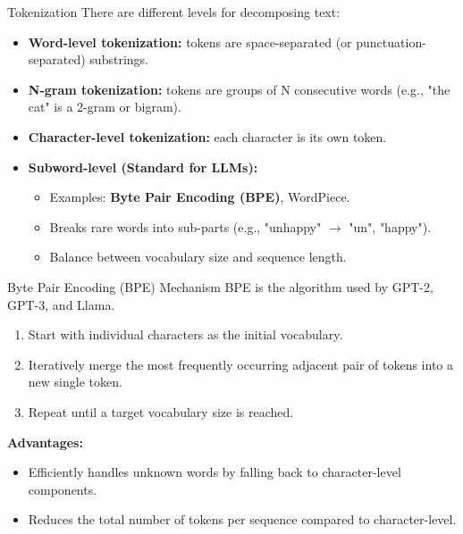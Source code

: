\documentclass[aspectratio=169]{beamer}
\begin{document}
%	


\begin{frame}{Tokenization}
	There are different levels for decomposing text:
	\begin{itemize}
		\item \textbf{Word-level tokenization:} tokens are space-separated (or punctuation-separated) substrings.
		\item \textbf{N-gram tokenization:} tokens are groups of N consecutive words (e.g., "the cat" is a 2-gram or bigram).
		\item \textbf{Character-level tokenization:} each character is its own token.
		\item \textbf{Subword-level (Standard for LLMs):}
		\begin{itemize}
			\item Examples: \textbf{Byte Pair Encoding (BPE)}, WordPiece.
			\item Breaks rare words into sub-parts (e.g., "unhappy" $\rightarrow$ "un", "happy").
			\item Balance between vocabulary size and sequence length.
		\end{itemize}
	\end{itemize}
\end{frame}


\begin{frame}{Byte Pair Encoding (BPE) Mechanism}
	BPE is the algorithm used by GPT-2, GPT-3, and Llama.
	\begin{enumerate}
		\item Start with individual characters as the initial vocabulary.
		\item Iteratively merge the most frequently occurring adjacent pair of tokens into a new single token.
		\item Repeat until a target vocabulary size is reached.
	\end{enumerate}
	\textbf{Advantages:}
	\begin{itemize}
		\item Efficiently handles unknown words by falling back to character-level components.
		\item Reduces the total number of tokens per sequence compared to character-level.
	\end{itemize}
\end{frame}
\end{document}
